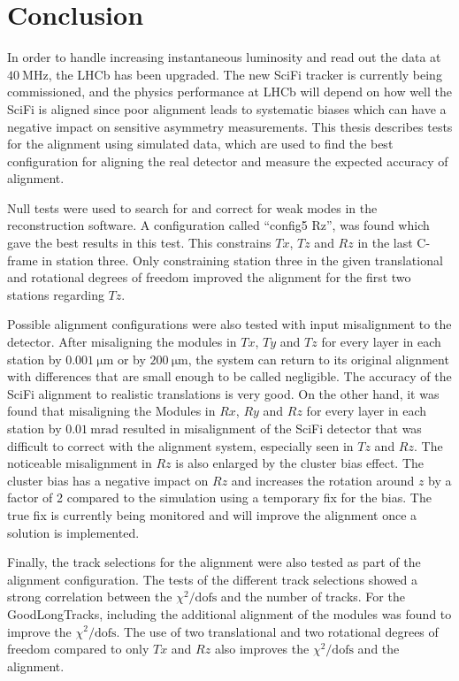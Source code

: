 \chapter{Conclusion}

In order to handle increasing instantaneous luminosity and read out the data at $\SI{40}{\mega\hertz}$, the LHCb has been upgraded. The new SciFi tracker is currently being commissioned, and the physics performance at LHCb will depend on how well the SciFi is aligned since poor alignment leads to systematic biases which can have a negative impact on sensitive asymmetry measurements. This thesis describes tests for the alignment using simulated data, which are used to find the best configuration for aligning the real detector and measure the expected accuracy of alignment.

Null tests were used to search for and correct for weak modes in the reconstruction software. A configuration called ``config5 Rz'', was found which gave the best results in this test. This constrains $Tx$, $Tz$ and $Rz$ in the last C-frame in station three.
Only constraining station three in the given translational and rotational degrees of freedom improved the alignment for the first two stations regarding $Tz$.

Possible alignment configurations were also tested with input misalignment to the detector. After misaligning the modules in $Tx$, $Ty$ and $Tz$ for every layer in each station by $\SI{0.001}{\micro\metre}$ or by $\SI{200}{\micro\metre}$, the system can return to its original alignment with differences that are small enough to be called negligible. The accuracy of the SciFi alignment to realistic translations is very good. On the other hand, it was found that misaligning the Modules in $Rx$, $Ry$ and $Rz$ for every layer in each station by $\SI{0.01}{\milli\radian}$ resulted in misalignment of the SciFi detector that was difficult to correct with the alignment system, especially seen in $Tz$ and $Rz$. The noticeable misalignment in $Rz$ is also enlarged by the cluster bias effect. The cluster bias has a negative impact on $Rz$ and increases the rotation around $z$ by a factor of 2 compared to the simulation using a temporary fix for the bias. The true fix is currently being monitored and will improve the alignment once a solution is implemented.

Finally, the track selections for the alignment were also tested as part of the alignment configuration. The tests of the different track selections showed a strong correlation between the $\chi^2 / \text{dofs}$ and the number of tracks.
For the GoodLongTracks, including the additional alignment of the modules was found to improve the $\chi^2 / \text{dofs}$. The use of two translational and two rotational degrees of freedom compared to only $Tx$ and $Rz$ also improves the $\chi^2 / \text{dofs}$ and the alignment.


